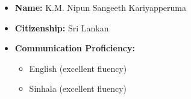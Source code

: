\documentclass[10pt, letterpaper]{article}
\newenvironment{highlights}{
    \begin{itemize}[
        topsep=0.10 cm,
        parsep=0.10 cm,
        partopsep=0pt,
        itemsep=0pt,
        leftmargin=0.4 cm + 10pt
    ]
}{
    \end{itemize}
} %
\begin{document}
\begin{highlights}
    \item \textbf{Name:} K.M. Nipun Sangeeth Kariyapperuma
    \item \textbf{Citizenship:} Sri Lankan
    \item \textbf{Communication Proficiency:}
    \begin{itemize}
        \item English (excellent fluency)
        \item Sinhala (excellent fluency)
    \end{itemize}
\end{highlights}

        
\end{document}
